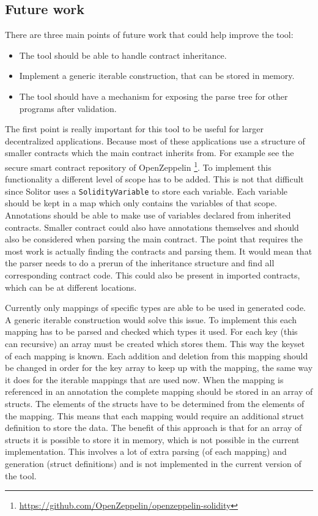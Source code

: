 \documentclass[a4paper]{article}
\begin{document}
\subsection{Future work}
There are three main points of future work that could help improve the tool:
\begin{itemize}
  \item The tool should be able to handle contract inheritance.
  \item Implement a generic iterable construction, that can be stored in memory.
  \item The tool should have a mechanism for exposing the parse tree for other programs after validation.
\end{itemize}
The first point is really important for this tool to be useful for larger decentralized applications. Because most of these applications use a structure of smaller contracts which the main contract inherits from. For example see the secure smart contract repository of OpenZeppelin \footnote{\url{https://github.com/OpenZeppelin/openzeppelin-solidity}}. To implement this functionality a different level of scope has to be added. This is not that difficult since Solitor uses a \texttt{SolidityVariable} to store each variable. Each variable should be kept in a map which only contains the variables of that scope. Annotations should be able to make use of variables declared from inherited contracts. Smaller contract could also have annotations themselves and should also be considered when parsing the main contract. The point that requires the most work is actually finding the contracts and parsing them. It would mean that the parser needs to do a prerun of the inheritance structure and find all corresponding contract code. This could also be present in imported contracts, which can be at different locations.\par
Currently only mappings of specific types are able to be used in generated code. A generic iterable construction would solve this issue. To implement this each mapping has to be parsed and checked which types it used. For each key (this can recursive) an array must be created which stores them. This way the keyset of each mapping is known. Each addition and deletion from this mapping should be changed in order for the key array to keep up with the mapping, the same way it does for the iterable mappings that are used now. When the mapping is referenced in an annotation the complete mapping should be stored in an array of structs. The elements of the structs have to be determined from the elements of the mapping. This means that each mapping would require an additional struct definition to store the data. The benefit of this approach is that for an array of structs it is possible to store it in memory, which  is not possible in the current implementation. This involves a lot of extra parsing (of each mapping) and generation (struct definitions) and is not implemented in the current version of the tool. \par
\end{document}
